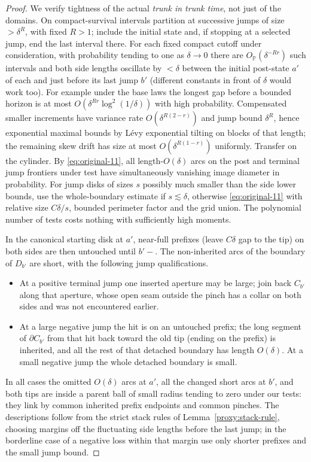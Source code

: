 \begin{proof}
We verify tightness of the actual \emph{trunk in trunk time}, not just of the domains.
On compact-survival intervals partition at successive jumps of size \(>\delta^R\), with fixed \(R>1\); include the initial state and, if stopping at a selected jump, end the last interval there.
For each fixed compact cutoff under consideration, with probability tending to one as \(\delta\to0\) there are \(O_{\mathbb P}(\delta^{-Rr})\) such intervals and both side lengths oscillate by \(<\delta\) between the initial post-state \(a'\) of each and just before its last jump \(b'\) (different constants in front of \(\delta\) would work too).
For example under the base laws the longest gap before a bounded horizon is at most \(O(\delta^{Rr}\log^2(1/\delta))\) with high probability.
Compensated smaller increments have variance rate \(O(\delta^{R(2-r)})\) and jump bound \(\delta^R\), hence exponential maximal bounds by Lévy exponential tilting on blocks of that length; the remaining skew drift has size at most \(O(\delta^{R(1-r)})\) uniformly.
Transfer on the cylinder.
By \eqref{eq:original-11}, all length-\(O(\delta)\) arcs on the post and terminal jump frontiers under test have simultaneously vanishing image diameter in probability.
For jump disks of sizes \(s\) possibly much smaller than the side lower bounds, use the whole-boundary estimate if \(s\lesssim\delta\), otherwise \eqref{eq:original-11} with relative size \(C\delta/s\), bounded perimeter factor and the grid union.
The polynomial number of tests costs nothing with sufficiently high moments.

In the canonical starting disk at \(a'\), near-full prefixes (leave \(C\delta\) gap to the tip) on both sides are then untouched until \(b'-\). The non-inherited arcs of the boundary of \(D_{b'}\) are short, with the following jump qualifications.
\begin{itemize}
\item At a positive terminal jump one inserted aperture may be large; join back \(C_{b'}\) along that aperture, whose open seam outside the pinch has a collar on both sides and was not encountered earlier.
\item At a large negative jump the hit is on an untouched prefix; the long segment of \(\partial C_{b'}\) from that hit back toward the old tip (ending on the prefix) is inherited, and all the rest of that detached boundary has length \(O(\delta)\). At a small negative jump the whole detached boundary is small.
\end{itemize}
In all cases the omitted \(O(\delta)\) arcs at \(a'\), all the changed short arcs at \(b'\), and both tips are inside a parent ball of small radius tending to zero under our tests: they link by common inherited prefix endpoints and common pinches.
The descriptions follow from the strict stack rules of Lemma~\ref{proxy:stack-rule}, choosing margins off the fluctuating side lengths before the last jump; in the borderline case of a negative loss within that margin use only shorter prefixes and the small jump bound.


\end{proof}
